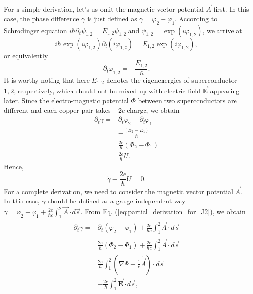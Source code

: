 For a simple derivation, let's us omit the magnetic vector potential
$\overrightarrow{A}$ first. In this case, the phase difference $\gamma$
is just defined as $\gamma=\varphi_{2}-\varphi_{1}$. According to
Schrodinger equation $i\hbar\partial_{t}\psi_{1,2}=E_{1,2}\psi_{1,2}$
and $\psi_{1,2}=\exp(i\varphi_{1,2})$, we arrive at
\begin{equation}
i\hbar\exp(i\varphi_{1,2})\partial_{t}(i\varphi_{1,2})=E_{1,2}\exp(i\varphi_{1,2}),
\end{equation}
or equivalently 
\begin{equation}
\partial_{t}\varphi_{1,2}=-\frac{E_{1,2}}{\hbar}.
\end{equation}
It is worthy noting that here $E_{1,2}$ denotes the eigenenergies
of superconductor $1,2$, respectively, which should not be mixed
up with electric field $\overrightarrow{\bm{E}}$ appearing later.
Since the electro-magnetic potential $\Phi$ between two superconductors
are different and each copper pair takes $-2e$ charge, we obtain
\begin{equation}
\begin{split}\partial_{t}\gamma= & \partial_{t}\varphi_{2}-\partial_{t}\varphi_{1}\\
= & -\frac{(E_{2}-E_{1})}{\hbar}\\
= & \frac{2e}{\hbar}(\Phi_{2}-\Phi_{1})\\
= & \frac{2e}{\hbar}U.
\end{split}
\label{eq:partial_derivation_for_J2}
\end{equation}
Hence, 
\begin{equation}
\dot{\gamma}-\frac{2e}{\hbar}U=0.
\end{equation}
For a complete derivation, we need to consider the magnetic vector
potential $\overrightarrow{A}$. In this case, $\gamma$ should be
defined as a gauge-independent way $\gamma=\varphi_{2}-\varphi_{1}+\frac{2e}{\hbar c}\int_{1}^{2}\overrightarrow{A}\cdot d\overrightarrow{s}$.
From Eq. (\ref{eq:partial_derivation_for_J2}), we obtain
\begin{equation}
\begin{split}\partial_{t}\gamma= & \partial_{t}(\varphi_{2}-\varphi_{1})+\frac{2e}{\hbar c}\int_{1}^{2}\dot{\overrightarrow{A}}\cdot d\overrightarrow{s}\\
= & \frac{2e}{\hbar}(\Phi_{2}-\Phi_{1})+\frac{2e}{\hbar c}\int_{1}^{2}\dot{\overrightarrow{A}}\cdot d\overrightarrow{s}\\
= & \frac{2e}{\hbar}\int_{1}^{2}(\nabla\Phi+\frac{1}{c}\dot{\overrightarrow{A}})\cdot d\overrightarrow{s}\\
= & -\frac{2e}{\hbar}\int_{1}^{2}\overrightarrow{\bm{E}}\cdot d\overrightarrow{s},
\end{split}
\label{eq:complete_proof_of_J2}
\end{equation}
